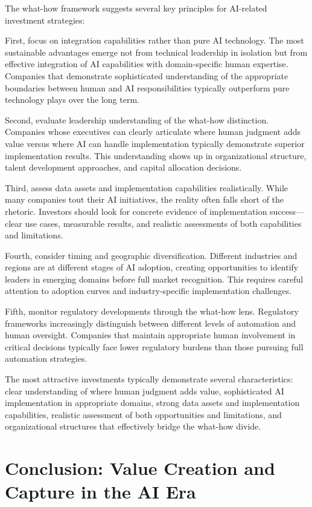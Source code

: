 \documentclass[
  Letterpaper,
]{scrbook}
\begin{document}
The what-how framework suggests several key principles for AI-related
investment strategies:

First, focus on integration capabilities rather than pure AI technology.
The most sustainable advantages emerge not from technical leadership in
isolation but from effective integration of AI capabilities with
domain-specific human expertise. Companies that demonstrate
sophisticated understanding of the appropriate boundaries between human
and AI responsibilities typically outperform pure technology plays over
the long term.

Second, evaluate leadership understanding of the what-how distinction.
Companies whose executives can clearly articulate where human judgment
adds value versus where AI can handle implementation typically
demonstrate superior implementation results. This understanding shows up
in organizational structure, talent development approaches, and capital
allocation decisions.

Third, assess data assets and implementation capabilities realistically.
While many companies tout their AI initiatives, the reality often falls
short of the rhetoric. Investors should look for concrete evidence of
implementation success---clear use cases, measurable results, and
realistic assessments of both capabilities and limitations.

Fourth, consider timing and geographic diversification. Different
industries and regions are at different stages of AI adoption, creating
opportunities to identify leaders in emerging domains before full market
recognition. This requires careful attention to adoption curves and
industry-specific implementation challenges.

Fifth, monitor regulatory developments through the what-how lens.
Regulatory frameworks increasingly distinguish between different levels
of automation and human oversight. Companies that maintain appropriate
human involvement in critical decisions typically face lower regulatory
burdens than those pursuing full automation strategies.

The most attractive investments typically demonstrate several
characteristics: clear understanding of where human judgment adds value,
sophisticated AI implementation in appropriate domains, strong data
assets and implementation capabilities, realistic assessment of both
opportunities and limitations, and organizational structures that
effectively bridge the what-how divide.

\section{Conclusion: Value Creation and Capture in the AI
Era}\label{conclusion-value-creation-and-capture-in-the-ai-era}
\end{document}
